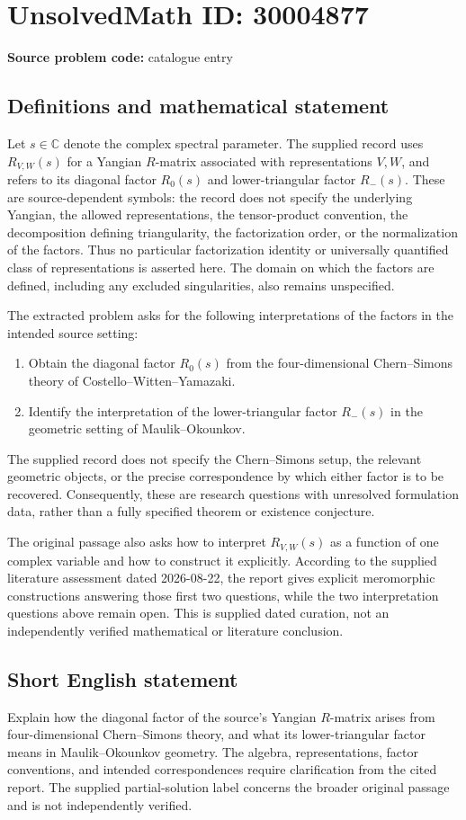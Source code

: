 \documentclass[11pt]{article}
\newcommand{\C}{\mathbb{C}}
\begin{document}
\section*{UnsolvedMath ID: 30004877}
\textbf{Source problem code:} catalogue entry
\subsection{Definitions and mathematical statement}
Let \(s\in\C\) denote the complex spectral parameter. The supplied record uses \(R_{V,W}(s)\) for a Yangian \(R\)-matrix associated with representations \(V,W\), and refers to its diagonal factor \(R_0(s)\) and lower-triangular factor \(R_-(s)\). These are source-dependent symbols: the record does not specify the underlying Yangian, the allowed representations, the tensor-product convention, the decomposition defining triangularity, the factorization order, or the normalization of the factors. Thus no particular factorization identity or universally quantified class of representations is asserted here. The domain on which the factors are defined, including any excluded singularities, also remains unspecified.

The extracted problem asks for the following interpretations of the factors in the intended source setting:
\begin{enumerate}
\item Obtain the diagonal factor \(R_0(s)\) from the four-dimensional Chern--Simons theory of Costello--Witten--Yamazaki.
\item Identify the interpretation of the lower-triangular factor \(R_-(s)\) in the geometric setting of Maulik--Okounkov.
\end{enumerate}
The supplied record does not specify the Chern--Simons setup, the relevant geometric objects, or the precise correspondence by which either factor is to be recovered. Consequently, these are research questions with unresolved formulation data, rather than a fully specified theorem or existence conjecture.

The original passage also asks how to interpret \(R_{V,W}(s)\) as a function of one complex variable and how to construct it explicitly. According to the supplied literature assessment dated 2026-08-22, the report gives explicit meromorphic constructions answering those first two questions, while the two interpretation questions above remain open. This is supplied dated curation, not an independently verified mathematical or literature conclusion.
\subsection{Short English statement}
Explain how the diagonal factor of the source's Yangian \(R\)-matrix arises from four-dimensional Chern--Simons theory, and what its lower-triangular factor means in Maulik--Okounkov geometry. The algebra, representations, factor conventions, and intended correspondences require clarification from the cited report. The supplied partial-solution label concerns the broader original passage and is not independently verified.
\end{document}
